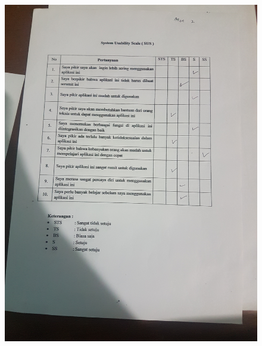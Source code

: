 \begin{figure}[H]
	\center
	\includegraphics [width = 17cm,angle=-90]{gambar/pengujian/agen2}
\end{figure}
